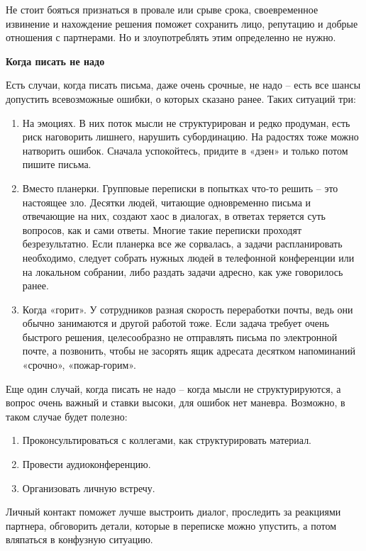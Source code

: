 Не стоит бояться признаться в провале или срыве срока, своевременное извинение и нахождение решения поможет сохранить лицо, репутацию и добрые отношения с партнерами. Но и злоупотреблять этим определенно не нужно.

\textbf{Когда писать не надо}

Есть случаи, когда писать письма, даже очень срочные, не надо – есть все шансы допустить всевозможные ошибки, о которых сказано ранее. Таких ситуаций три:
\begin{enumerate}
    \item На эмоциях. В них поток мысли не структурирован и редко продуман, есть риск наговорить лишнего, нарушить субординацию. На радостях тоже можно натворить ошибок. Сначала успокойтесь, придите в «дзен» и только потом пишите письма.
    \item Вместо планерки. Групповые переписки в попытках что-то решить – это настоящее зло. Десятки людей, читающие одновременно письма и отвечающие на них, создают хаос в диалогах, в ответах теряется суть вопросов, как и сами ответы. Многие такие переписки проходят безрезультатно. Если планерка все же сорвалась, а задачи распланировать необходимо, следует собрать нужных людей в телефонной конференции или на локальном собрании, либо раздать задачи адресно, как уже говорилось ранее.
    \item Когда «горит». У сотрудников разная скорость переработки почты, ведь они обычно занимаются и другой работой тоже. Если задача требует очень быстрого решения, целесообразно не отправлять письма по электронной почте, а позвонить, чтобы не засорять ящик адресата десятком напоминаний «срочно», «пожар-горим».
\end{enumerate}

Еще один случай, когда писать не надо – когда мысли не структурируются, а вопрос очень важный и ставки высоки, для ошибок нет маневра. Возможно, в таком случае будет полезно:
\begin{enumerate}
    \item Проконсультироваться с коллегами, как структурировать материал.
    \item Провести аудиоконференцию.
    \item Организовать личную встречу.
\end{enumerate}

Личный контакт поможет лучше выстроить диалог, проследить за реакциями партнера, обговорить детали, которые в переписке можно упустить, а потом вляпаться в конфузную ситуацию.

